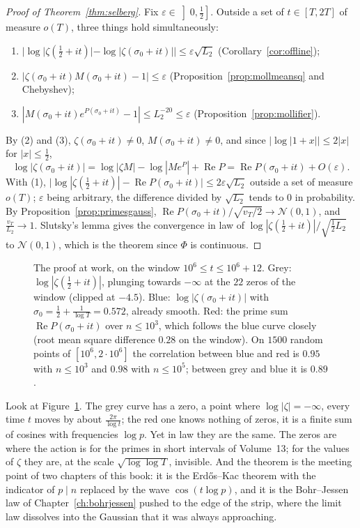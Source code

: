\begin{proof}[Proof of Theorem~\ref{thm:selberg}]
Fix $\varepsilon\in\left]0,\frac12\right]$. Outside a set of $t\in[T,2T]$ of measure $o(T)$, three things hold simultaneously:
\begin{enumerate}
\item $|\log|\zeta(\frac12+it)|-\log|\zeta(\sigma_0+it)||\le\varepsilon\sqrt{L_2}$ (Corollary~\ref{cor:offline});
\item $|\zeta(\sigma_0+it)M(\sigma_0+it)-1|\le\varepsilon$ (Proposition~\ref{prop:mollmeansq} and Chebyshev);
\item $|M(\sigma_0+it)e^{P(\sigma_0+it)}-1|\le L_2^{-20}\le\varepsilon$ (Proposition~\ref{prop:mollifier}).
\end{enumerate}
By (2) and (3), $\zeta(\sigma_0+it)\ne0$, $M(\sigma_0+it)\ne0$, and since $|\log|1+x||\le2|x|$ for $|x|\le\frac12$,
\[
\log|\zeta(\sigma_0+it)|=\log|\zeta M|-\log|Me^P|+\operatorname{Re}P=\operatorname{Re}P(\sigma_0+it)+O(\varepsilon).
\]
With (1), $\bigl|\log|\zeta(\frac12+it)|-\operatorname{Re}P(\sigma_0+it)\bigr|\le2\varepsilon\sqrt{L_2}$ outside a set of measure $o(T)$; $\varepsilon$ being arbitrary, the difference divided by $\sqrt{L_2}$ tends to $0$ in probability. By Proposition~\ref{prop:primesgauss}, $\operatorname{Re}P(\sigma_0+it)/\sqrt{v_T/2}\to\mathcal N(0,1)$, and $\frac{v_T}{L_2}\to1$. Slutsky's lemma gives the convergence in law of $\log|\zeta(\frac12+it)|/\sqrt{\frac12L_2}$ to $\mathcal N(0,1)$, which is the theorem since $\Phi$ is continuous.
\end{proof}

\begin{figure}[ht]
\centering{}
\caption{The proof at work, on the window $10^6\le t\le10^6+12$. Grey: $\log|\zeta(\frac12+it)|$, plunging towards $-\infty$ at the $22$ zeros of the window (clipped at $-4.5$). Blue: $\log|\zeta(\sigma_0+it)|$ with $\sigma_0=\frac12+\frac1{\log T}=0.572$, already smooth. Red: the prime sum $\operatorname{Re}P(\sigma_0+it)$ over $n\le10^3$, which follows the blue curve closely (root mean square difference $0.28$ on the window). On $1500$ random points of $[10^6,2\cdot10^6]$ the correlation between blue and red is $0.95$ with $n\le10^3$ and $0.98$ with $n\le10^5$; between grey and blue it is $0.89$.}
\label{fig:selbergwindow}
\end{figure}

\begin{beauty}
Look at Figure~\ref{fig:selbergwindow}. The grey curve has a zero, a point where $\log|\zeta|=-\infty$, every time $t$ moves by about $\frac{2\pi}{\log t}$; the red one knows nothing of zeros, it is a finite sum of cosines with frequencies $\log p$. Yet in law they are the same. The zeros are where the action is for the primes in short intervals of Volume~13; for the values of $\zeta$ they are, at the scale $\sqrt{\log\log T}$, invisible. And the theorem is the meeting point of two chapters of this book: it is the Erd\H{o}s--Kac theorem with the indicator of $p\mid n$ replaced by the wave $\cos(t\log p)$, and it is the Bohr--Jessen law of Chapter~\ref{ch:bohrjessen} pushed to the edge of the strip, where the limit law dissolves into the Gaussian that it was always approaching.
\end{beauty}

